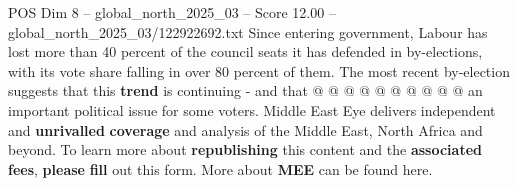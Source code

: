 \begin{textsample}{POS Dim 8 – global\_north\_2025\_03 – Score 12.00 – global\_north\_2025\_03/122922692.txt}
Since entering government, Labour has lost more than 40 percent of the council seats it has defended in by-elections, with its vote share falling in over 80 percent of them.
The most recent by-election suggests that this \textbf{trend} is continuing - and that @ @ @ @ @ @ @ @ @ @ an important political issue for some voters.
Middle East Eye delivers independent and \textbf{unrivalled} \textbf{coverage} and analysis of the Middle East, North Africa and beyond.
To learn more about \textbf{republishing} this content and the \textbf{associated} \textbf{fees}, \textbf{please} \textbf{fill} out this form.
More about \textbf{MEE} can be found here.

\end{textsample}
